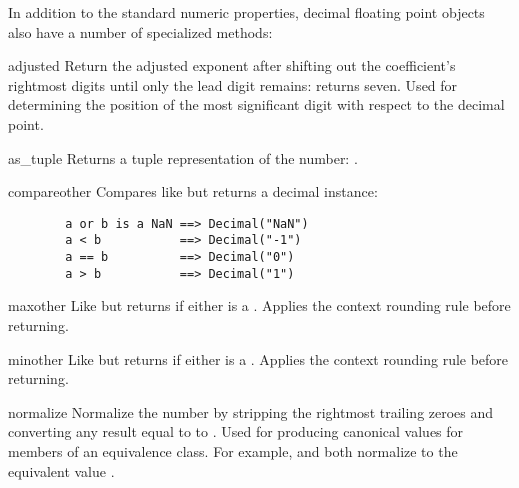 In addition to the standard numeric properties, decimal floating point objects
also have a number of specialized methods:

\begin{methoddesc}{adjusted}{}
  Return the adjusted exponent after shifting out the coefficient's rightmost
  digits until only the lead digit remains: 
  returns seven.  Used for determining the position of the most significant
  digit with respect to the decimal point.
\end{methoddesc}

\begin{methoddesc}{as_tuple}{}
  Returns a tuple representation of the number:
  .
\end{methoddesc}

\begin{methoddesc}{compare}{other}
  Compares like  but returns a decimal instance:
  \begin{verbatim}
        a or b is a NaN ==> Decimal("NaN")
        a < b           ==> Decimal("-1")
        a == b          ==> Decimal("0")
        a > b           ==> Decimal("1")
  \end{verbatim}
\end{methoddesc}

\begin{methoddesc}{max}{other}
  Like  but returns  if either is a
  .  Applies the context rounding rule before returning.
\end{methoddesc}

\begin{methoddesc}{min}{other}
  Like  but returns  if either is a
  .  Applies the context rounding rule before returning.
\end{methoddesc}

\begin{methoddesc}{normalize}{}
  Normalize the number by stripping the rightmost trailing zeroes and
  converting any result equal to  to
  . Used for producing canonical values for members
  of an equivalence class. For example,  and
   both normalize to the equivalent value
  .
\end{methoddesc}                                              

